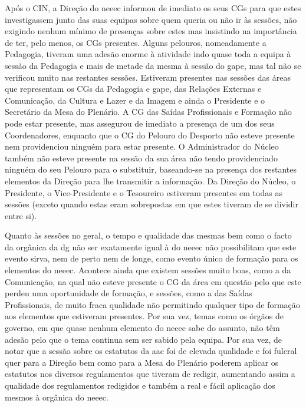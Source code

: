 Após o CIN, a Direção do \acrshort{neeec} informou de imediato os seus CGs para que estes investigassem junto das suas equipas sobre quem queria ou não ir às sessões, não exigindo nenhum mínimo de presenças sobre estes mas insistindo na importância de ter, pelo menos, os CGs presentes. Alguns pelouros, nomeadamente a Pedagogia, tiveram uma adesão enorme à atividade indo quase toda a equipa à sessão da Pedagogia e mais de metade da mesma à sessão do \acrshort{gape}, mas tal não se verificou muito nas restantes sessões. Estiveram presentes nas sessões das áreas que representam os CGs da Pedagogia e \acrshort{gape}, das Relações Externas e Comunicação, da Cultura e Lazer e da Imagem e ainda o Presidente e o Secretário da Mesa do Plenário. A CG das Saídas Profissionais e Formação não pode estar presente, mas assegurou de imediato a presença de um dos seus Coordenadores, enquanto que o CG do Pelouro do Desporto não esteve presente nem providenciou ninguém para estar presente. O Administrador do Núcleo também não esteve presente na sessão da sua área não tendo providenciado ninguém do seu Pelouro para o substituir, baseando-se na presença dos restantes elementos da Direção para lhe transmitir a informação. Da Direção do Núcleo, o Presidente, o Vice-Presidente e o Tesoureiro estiveram presentes em todas as sessões (exceto quando estas eram sobrepostas em que estes tiveram de se dividir entre si).

Quanto às sessões no geral, o tempo e qualidade das mesmas bem como o facto da orgânica da \acrshort{dg} não ser exatamente igual à do \acrshort{neeec} não possibilitam que este evento sirva, nem de perto nem de longe, como evento único de formação para os elementos do \acrshort{neeec}. Acontece ainda que existem sessões muito boas, como a da Comunicação, na qual não esteve presente o CG da área em questão pelo que este perdeu uma oportunidade de formação, e sessões, como a das Saídas Profissionais, de muito fraca qualidade não permitindo qualquer tipo de formação aos elementos que estiveram presentes. Por sua vez, temas como os órgãos de governo, em que quase nenhum elemento do \acrshort{neeec} sabe do assunto, não têm adesão pelo que o tema continua sem ser sabido pela equipa. Por sua vez, de notar que a sessão sobre os estatutos da \acrshort{aac} foi de elevada qualidade e foi fulcral quer para a Direção bem como para a Mesa do Plenário poderem aplicar os estatutos nos diversos regulamentos que tiveram de redigir, aumentando assim a qualidade dos regulamentos redigidos e também a real e fácil aplicação dos mesmos à orgânica do \acrshort{neeec}.


